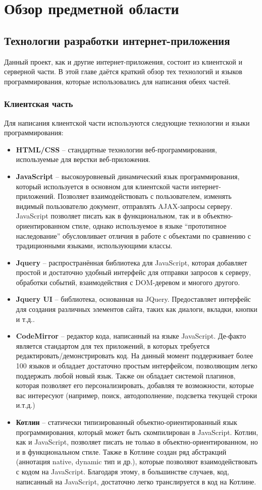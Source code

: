 \chapter{Обзор предметной области}
\section{Технологии разработки интернет-приложения}
	Данный проект, как и другие интернет-приложения,  состоит из клиентской и серверной части. В этой главе даётся краткий обзор тех технологий и языков программирования, которые использовались для написания обеих частей.
\subsection{Клиентская часть}
	Для написания клиентской части используются следующие технологии и языки программирования:
\begin{itemize}
	\item \textbf{HTML/CSS} -- стандартные технологии веб-программирования, используемые для верстки веб-приложения.
	\item \textbf{JavaScript} -- высокоуровневый динамический язык программирования, который используется в основном для клиентской части интернет-приложений. Позволяет взаимодействовать с пользователем, изменять видимый пользователю документ, отправлять AJAX-запросы серверу. JavaScript позволяет писать как в функциональном, так и в объектно-ориентированном стиле, однако используемое в языке ``прототипное наследование'' обусловливает отличия в работе с объектами по сравнению с традиционными языками, использующими классы.
	\item \textbf{Jquery} -- распространённая библиотека для JavaScript, которая добавляет простой и достаточно удобный интерфейс для отправки запросов к серверу, обработки событий, взаимодействия с DOM-деревом и многого другого.
	\item \textbf{Jquery UI} -- библиотека, основанная на JQuery. Предоставляет интерфейс для создания различных элементов сайта, таких как диалоги, вкладки, кнопки и т.д..
	\item \textbf{CodeMirror} -- редактор кода, написанный на языке JavaScript. Де-факто является стандартом для тех приложений, в которых требуется редактировать/демонстрировать код. На данный момент поддерживает более 100 языков и обладает достаточно простым интерфейсом, позволяющим легко поддержать любой новый язык. Также он обладает системой плагинов, которая позволяет его персонализировать, добавляя те возможности, которые вас интересуют (например, поиск, автодополнение, подсветка текущей строки и.т.д.)
	\item \textbf{Котлин} -- статически типизированный объектно-ориентированный язык программирования, который может быть скомпилирован в JavaScript. Котлин, как и JavaScript, позволяет писать не только в объектно-ориентированном, но и в функциональном стиле. Также в Котлине создан ряд абстракций (аннотация native, dynamic тип и др.), которые позволяют взаимодействовать с кодом на JavaScript. Благодаря этому, в большинстве случаев, код, написанный на JavaScript, достаточно легко транслируется в код на Котлине. 
\end{itemize}
